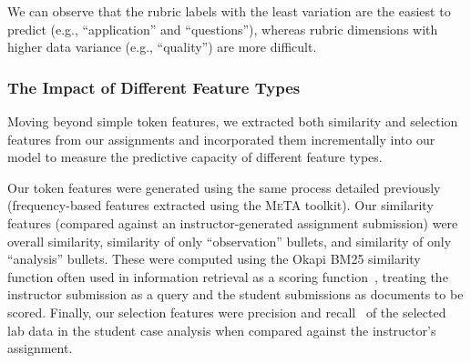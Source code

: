 

We can observe that the rubric labels with the least variation are the
easiest to predict (e.g., ``application'' and ``questions''), whereas
rubric dimensions with higher data variance (e.g., ``quality'') are more
difficult.


\subsubsection{The Impact of Different Feature Types}
Moving beyond simple token features, we extracted both similarity and
selection features from our assignments and incorporated them
incrementally into our model to measure the predictive capacity of
different feature types.

Our token features were generated using the same process detailed
previously (frequency-based features extracted using the \textsc{MeTA}
toolkit). Our similarity features (compared against an instructor-generated
assignment submission) were overall similarity, similarity of only
``observation'' bullets, and similarity of only ``analysis'' bullets.
These were computed using the Okapi BM25 similarity function often used in
information retrieval as a scoring function~\cite{Manning:2008}, treating
the instructor submission as a query and the student submissions as
documents to be scored. Finally, our selection features were precision and
recall~\cite{Manning:2008} of the selected lab data in the student case
analysis when compared against the instructor's assignment.


